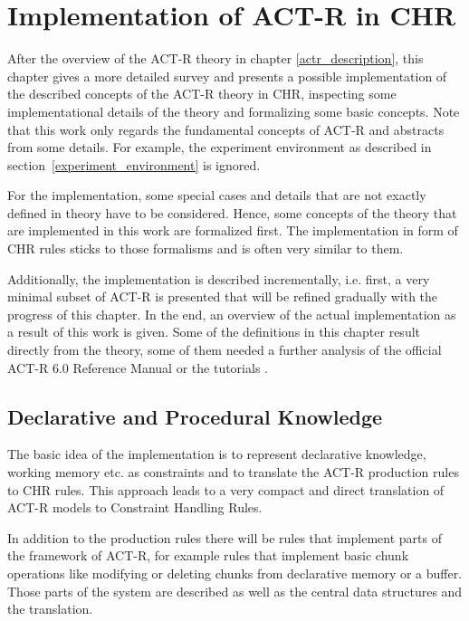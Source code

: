\chapter{Implementation of ACT-R in CHR}
\label{implementation}

After the overview of the ACT-R theory in chapter \ref{actr_description}, this chapter gives a more detailed survey and presents a possible implementation of the described concepts of the ACT-R theory in CHR, inspecting some implementational details of the theory and formalizing some basic concepts. Note that this work only regards the fundamental concepts of ACT-R and abstracts from some details. For example, the experiment environment as described in section~\ref{experiment_environment} is ignored.

For the implementation, some special cases and details that are not exactly defined in theory have to be considered. Hence, some concepts of the theory that are implemented in this work are formalized first. The implementation in form of CHR rules sticks to those formalisms and is often very similar to them.

Additionally, the implementation is described incrementally, i.e. first, a very minimal subset of ACT-R is presented that will be refined gradually with the progress of this chapter. In the end, an overview of the actual implementation as a result of this work is given. Some of the definitions in this chapter result directly from the theory, some of them needed a further analysis of the official ACT-R 6.0 Reference Manual \cite{actr_reference} or the tutorials \cite{actr_tutorial}. 

\section{Declarative and Procedural Knowledge}

The basic idea of the implementation is to represent declarative knowledge, working memory etc. as constraints and to translate the ACT-R production rules to CHR rules. This approach leads to a very compact and direct translation of ACT-R models to Constraint Handling Rules.

In addition to the production rules there will be rules that implement parts of the framework of ACT-R, for example rules that implement basic chunk operations like modifying or deleting chunks from declarative memory or a buffer. Those parts of the system are described as well as the central data structures and the translation.

